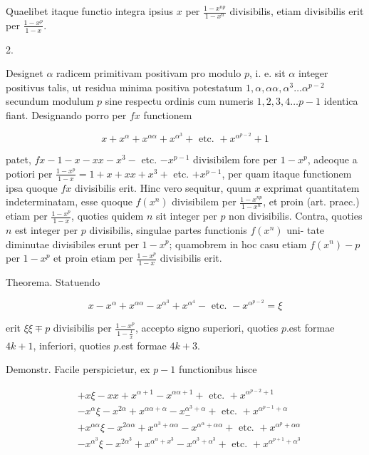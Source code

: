 \documentclass[10pt]{article}
\begin{document}
Quaelibet itaque functio integra ipsius \(x\) per \(\frac{1-x^{n p}}{1-x^{n}}\) divisibilis, etiam divisibilis erit per \(\frac{1-x^{p}}{1-x}\).

2.

Designet \(\alpha\) radicem primitivam positivam pro modulo \(p\), i. e. sit \(\alpha\) integer positivus talis, ut residua minima positiva potestatum \(1, \alpha, \alpha \alpha, \alpha^{3} \ldots \alpha^{p-2}\) secundum modulum \(p\) sine respectu ordinis cum numeris \(1,2,3,4 \ldots p-1\) identica fiant. Designando porro per \(f x\) functionem

\[
x+x^{\alpha}+x^{\alpha \alpha}+x^{\alpha^{3}}+\text { etc. }+x^{\alpha^{p-2}}+1
\]

patet, \(f x-1-x-x x-x^{3}-\) etc. \(-x^{p-1}\) divisibilem fore per \(1-x^{p}\), adeoque a potiori per \(\frac{1-x^{p}}{1-x}=1+x+x x+x^{3}+\) etc. \(+x^{p-1}\), per quam itaque functionem ipsa quoque \(f x\) divisibilis erit. Hinc vero sequitur, quum \(x\) exprimat quantitatem indeterminatam, esse quoque \(f\left(x^{n}\right)\) divisibilem per \(\frac{1-x^{n p}}{1-x^{n}}\), et proin (art. praec.) etiam per \(\frac{1-x^{p}}{1-x}\), quoties quidem \(n\) sit integer per \(p\) non divisibilis. Contra, quoties \(n\) est integer per \(p\) divisibilis, singulae partes functionis \(f\left(x^{n}\right)\) uni-
tate diminutae divisibiles erunt per \(1-x^{p}\); quamobrem in hoc casu etiam \(f\left(x^{n}\right)-p\) per \(1-x^{p}\) et proin etiam per \(\frac{1-x^{p}}{1-x}\) divisibilis erit.

Theorema. Statuendo

\[
x-x^{\alpha}+x^{\alpha \alpha}-x^{\alpha^{3}}+x^{\alpha^{4}}-\text { etc. }-x^{\alpha^{p-2}}=\xi
\]

erit \(\xi \xi \mp p\) divisibilis per \(\frac{1-x^{p}}{1-\frac{1}{x}}\), accepto signo superiori, quoties \(p\).est formae \(4 k+1\), inferiori, quoties \(p\).est formae \(4 k+3\).

Demonstr. Facile perspicietur, ex \(p-1\) functionibus hisce

\[
\begin{aligned}
& +x \xi-x x+x^{\alpha+1}-x^{\alpha \alpha+1}+\text { etc. }+x^{\alpha^{p-2}+1} \\
& -x^{\alpha} \xi-x^{2 \alpha}+x^{\alpha \alpha+\alpha}-x_{-}^{\alpha^{3}+\alpha}+\text { etc. }+x^{\alpha^{p-1}+\alpha} \\
& +x^{\alpha \alpha} \xi-x^{2 \alpha \alpha}+x^{\alpha^{3}+\alpha \alpha}-x^{\alpha^{\alpha}+\alpha \alpha}+\text { etc. }+x^{\alpha^{p}+\alpha \alpha} \\
& -x^{\alpha^{3}} \xi-x^{2 \alpha^{3}}+x^{\alpha^{\alpha}+x^{3}}-x^{\alpha^{3}+\alpha^{3}}+\text { etc. }+x^{\alpha^{p+1}+\alpha^{3}}
\end{aligned}
\]
\end{document}
